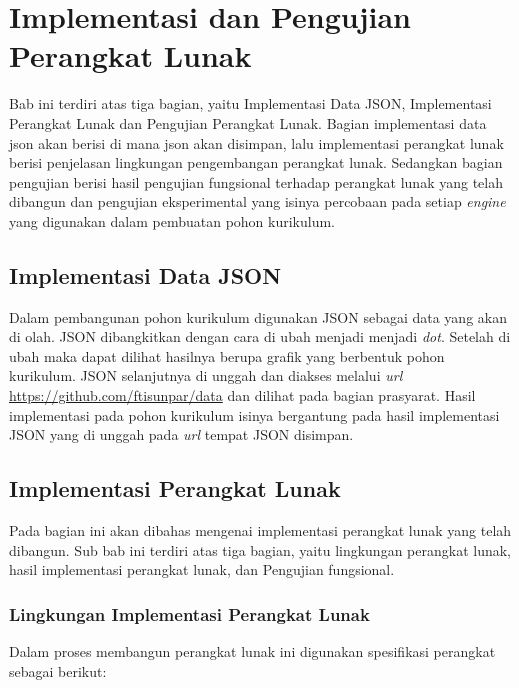 \chapter{Implementasi dan Pengujian Perangkat Lunak}
\label{chap: Implementasi dan Pengujian Perangkat Lunak}

Bab ini terdiri atas tiga bagian, yaitu Implementasi Data JSON, Implementasi Perangkat Lunak dan Pengujian Perangkat Lunak. Bagian implementasi data json akan berisi di mana json akan disimpan, lalu implementasi perangkat lunak berisi penjelasan lingkungan pengembangan perangkat lunak. Sedangkan bagian pengujian berisi hasil pengujian fungsional terhadap perangkat lunak yang telah dibangun dan pengujian eksperimental yang isinya percobaan pada setiap \textit{engine} yang digunakan dalam pembuatan pohon kurikulum.

\section{Implementasi Data JSON}
\label{sec: Implementasi Data JSON}

Dalam pembangunan pohon kurikulum digunakan JSON sebagai data yang akan di olah. JSON dibangkitkan dengan cara di ubah menjadi menjadi \textit{dot}. Setelah di ubah maka dapat dilihat hasilnya berupa grafik yang berbentuk pohon kurikulum. JSON selanjutnya di unggah dan diakses melalui \textit{url} \url{https://github.com/ftisunpar/data} dan dilihat pada bagian prasyarat. Hasil implementasi pada pohon kurikulum isinya bergantung pada hasil implementasi JSON yang di unggah pada \textit{url} tempat JSON disimpan.

\section{Implementasi Perangkat Lunak}
\label{sec: Implementasi Perangkat Lunak}

Pada bagian ini akan dibahas mengenai implementasi perangkat lunak yang telah dibangun. Sub bab ini terdiri atas tiga bagian, yaitu lingkungan perangkat lunak, hasil implementasi perangkat lunak, dan Pengujian fungsional.

\subsection{Lingkungan Implementasi Perangkat Lunak}
\label{sec: Lingkungan Implementasi Perangkat Lunak}

Dalam proses membangun perangkat lunak ini digunakan spesifikasi perangkat sebagai berikut:

